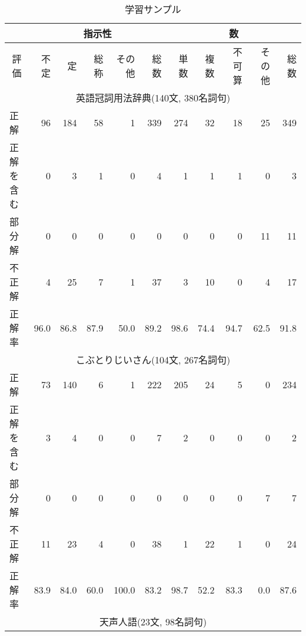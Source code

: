 \begin{table}[t]
\small

\caption{学習サンプル}\label{tab:kanshi_d}

\begin{center}


{

\begin{tabular}[c]{|l|r|r|r|r|r|r|r|r|r|r|} \hline
 & \multicolumn{5}{c|}{指示性}  &  \multicolumn{5}{c|}{数}  \\ \hline 
\multicolumn{1}{|c|}{評価}  &  不定  &  定 &  総称 &  その他 & 総数 &  単数   &  複数    &  不可算 &  その他 &   総数  \\ \hline
\multicolumn{11}{|c|}{英語冠詞用法辞典(140文, 380名詞句)} \\ \hline 
   正解   &      96  &     184  &      58  &       1  &     339  &    274 &    32 &      18  &      25  &  349   \\ 
正解を含む&       0  &       3  &       1  &       0  &       4  &       1  &       1  &       1  &       0  &       3  \\ 
  部分解  &       0  &       0  &       0  &       0  &       0  &       0  &       0  &       0  &      11  &      11  \\ 
  不正解  &       4  &      25  &       7  &       1  &      37  &       3  &      10  &       0  &       4  &      17   \\ 
\hline 
 正解率&    96.0  &    86.8  &    87.9  &    50.0  &    89.2  &    98.6  &    74.4  &    94.7  &    62.5  &    91.8    \\ \hline 
\multicolumn{11}{|c|}{こぶとりじいさん(104文, 267名詞句)} \\ \hline 
   正解   &      73  &     140 &       6  &       1  &    222  &    205  &     24  &       5  &       0  &   234   \\ 
正解を含む&       3  &       4  &       0  &       0  &       7 &       2  &       0  &       0  &       0  &       2    \\ 
  部分解  &       0  &       0  &       0  &       0  &       0   &       0  &       0  &       0  &       7  &       7  \\ 
  不正解  &      11  &      23  &       4  &       0  &      38    &       1  &      22  &       1  &       0  &      24   \\ 
\hline
正解率&   83.9  &   84.0  &   60.0  &  100.0  &   83.2  &   98.7  &   52.2  &   83.3  &    0.0  &   87.6    \\ \hline 
\multicolumn{11}{|c|}{天声人語(23文, 98名詞句)} \\ \hline 

\end{tabular}}
\end{center}
\end{table}
